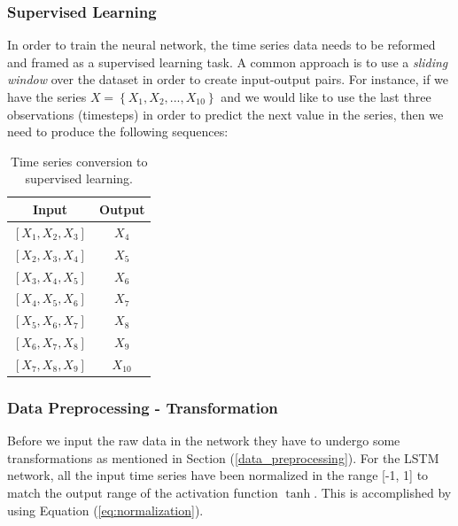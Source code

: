 \documentclass[a4paper, 12pt]{article}
\numberwithin{equation}{section}
\numberwithin{figure}{section}
\numberwithin{table}{section}
\begin{document}
	\subsubsection{Supervised Learning} \label{subsection:supervised}
	
	In order to train the neural network, the time series data needs to be reformed and framed as a supervised learning task. A common approach is to use a \textit{sliding window} over the dataset in order to create input-output pairs. For instance, if we have the series $X = \left\{X_1, X_2, ..., X_{10}\right\} $ and we would like to use the last three observations (timesteps) in order to predict the next value in the series, then we need to produce the following sequences:

	\begin{table}[H]
		\centering
		\begin{tabular}{@{} cc @{}}
			\toprule
			Input & Output \\
			\midrule
			$\left[X_1, X_2, X_3 \right]$ & $X_4$ \\
			
			$\left[X_2, X_3, X_4 \right]$ & $X_5$ \\
			
			$\left[X_3, X_4, X_5 \right]$ & $X_6$ \\
			
			$\left[X_4, X_5, X_6 \right]$ & $X_7$ \\
			
			$\left[X_5, X_6, X_7 \right]$ & $X_8$ \\
			
			$\left[X_6, X_7, X_8 \right]$ & $X_9$ \\
			
			$\left[X_7, X_8, X_9 \right]$ & $X_{10}$ \\	
			\bottomrule
		\end{tabular}
		\caption{Time series conversion to supervised learning.}
		\label{table:supervised}
	\end{table}

	\subsubsection{Data Preprocessing - Transformation}

	Before we input the raw data in the network they have to undergo some transformations as mentioned in Section (\ref{data_preprocessing}). For the LSTM network, all the input time series have been normalized in the range [-1, 1] to match the output range of the activation function $\tanh$. This is accomplished by using Equation (\ref{eq:normalization}).\par
	
\end{document}
